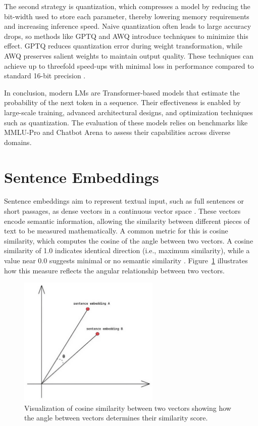 \documentclass[a4paper,oneside,bibliography=totoc]{scrbook}
\begin{document}
The second strategy is quantization, which compresses a model by reducing the bit-width used to store each parameter, thereby lowering memory requirements and increasing inference speed. Naive quantization often leads to large accuracy drops, so methods like GPTQ and AWQ introduce techniques to minimize this effect. GPTQ reduces quantization error during weight transformation, while AWQ preserves salient weights to maintain output quality. These techniques can achieve up to threefold speed-ups with minimal loss in performance compared to standard 16-bit precision \cite{Frantar2023,Lin2024}.

In conclusion, modern \acp{LM} are Transformer-based models that estimate the probability of the next token in a sequence. Their effectiveness is enabled by large-scale training, advanced architectural designs, and optimization techniques such as quantization. The evaluation of these models relies on benchmarks like MMLU-Pro and Chatbot Arena to assess their capabilities across diverse domains.

\section{Sentence Embeddings}
\label{sec:sentence_embeddings}

Sentence embeddings aim to represent textual input, such as full sentences or short passages, as dense vectors in a continuous vector space \cite{Singhal2001}. These vectors encode semantic information, allowing the similarity between different pieces of text to be measured mathematically. A common metric for this is cosine similarity, which computes the cosine of the angle between two vectors. A cosine similarity of 1.0 indicates identical direction (i.e., maximum similarity), while a value near 0.0 suggests minimal or no semantic similarity \cite{Singhal2001}. Figure~\ref{fig:cosine_similarity} illustrates how this measure reflects the angular relationship between two vectors.

\begin{figure}[t]
  \centering
  \includegraphics[width=0.6\textwidth]{figures/cosine_similarity.jpeg}
  \caption[Visualization of cosine similarity between two vectors showing how the angle between vectors determines their similarity score]{Visualization of cosine similarity between two vectors showing how the angle between vectors determines their similarity score. \cite{Leys2022}}
  \label{fig:cosine_similarity}
\end{figure}
\end{document}
